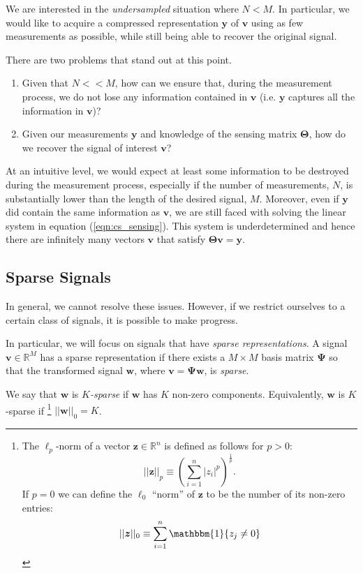 We are interested in the \emph{undersampled} situation where $N < M$.
In particular, we would like to acquire a compressed representation $\bm y$ of $\bm v$ using as few measurements as possible, while still being able to recover the original signal.

There are two problems that stand out at this point. 
\begin{enumerate}
\item Given that $N << M$, how can we ensure that, during the measurement process, we do not lose any information contained in $\bm v$ (i.e. $\bm y$ captures all the information in $\bm v$)?
\item Given our measurements $\bm y$ and knowledge of the sensing matrix $\bm\Theta$, how do we recover the signal of interest $\bm v$?
\end{enumerate}

At an intuitive level, we would expect at least some information to be destroyed during the measurement process, especially if the number of measurements, $N$, is substantially lower than the length of the desired signal, $M$.
Moreover, even if $\bm y$ did contain the same information as $\bm v$, we are still faced with solving the linear system in equation (\ref{eqn:cs_sensing}).
This system is underdetermined and hence there are infinitely many vectors $\bm v$ that satisfy $\bm\Theta\bm v=\bm y$. 

\subsection{Sparse Signals}
In general, we cannot resolve these issues.
However, if we restrict ourselves to a certain class of signals, it is possible to make progress.

In particular, we will focus on signals that have \emph{sparse representations}.
A signal $\bm v \in\mathbb{R}^M$ has a sparse representation if there exists a $M\times M$ basis matrix $\bm\Psi$ so that the transformed signal $\bm w$, where $\bm v = \bm\Psi\bm w$, is \emph{sparse}.

We say that $\bm w$ is \emph{$K$-sparse} if $\bm w$ has $K$ non-zero components.
Equivalently, $\bm w$ is $K$-sparse if 
\footnote{The $\ell_p$-norm of a vector $\bm z \in\mathbb{R}^n$ is defined as follows for $p>0$:
\begin{equation*}
\label{eqn:lp-norm}
  ||\bm z||_p \equiv \left( \sum_{i=1}^n |z_i|^p \right)^\frac{1}{p}.
\end{equation*}
If $p=0$ we can define the $\ell_0$ ``norm'' of $\bm z$ to be the number of its non-zero entries:
\begin{equation*}
\label{eqn:l0-norm}
  ||\bm z||_0 \equiv  \sum_{i=1}^n \mathbbm{1}\{z_j \neq 0\}
\end{equation*}
}
$||\bm w||_0 = K$.


